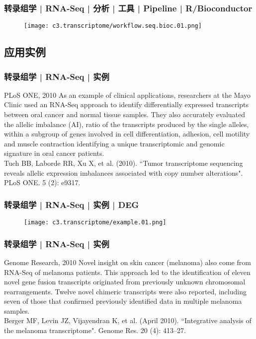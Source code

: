 \begin{frame}
  \frametitle{转录组学 | RNA-Seq | 分析 | 工具 | Pipeline | R/Bioconductor}
  \begin{figure}
    \centering
    \texttt{[image: c3.transcriptome/workflow.seq.bioc.01.png]}
  \end{figure}
\end{frame}

\subsection{应用实例}
\begin{frame}
  \frametitle{转录组学 | RNA-Seq | 实例}
  \begin{block}{PLoS ONE, 2010}
  As an example of clinical applications, researchers at the Mayo Clinic used an RNA-Seq approach to identify differentially expressed transcripts between oral cancer and normal tissue samples. They also accurately evaluated the allelic imbalance (AI), ratio of the transcripts produced by the single alleles, within a subgroup of genes involved in cell differentiation, adhesion, cell motility and muscle contraction identifying a unique transcriptomic and genomic signature in oral cancer patients.\\
  \vspace{0.5em}
 Tuch BB, Laborde RR, Xu X, et al. (2010). ``Tumor transcriptome sequencing reveals allelic expression imbalances associated with copy number alterations". PLoS ONE. 5 (2): e9317. 
  \end{block}
\end{frame}

\begin{frame}
  \frametitle{转录组学 | RNA-Seq | 实例 | DEG}
  \begin{figure}
    \centering
    \texttt{[image: c3.transcriptome/example.01.png]}
  \end{figure}
\end{frame}

\begin{frame}
  \frametitle{转录组学 | RNA-Seq | 实例}
  \begin{block}{Genome Research, 2010}
   Novel insight on skin cancer (melanoma) also come from RNA-Seq of melanoma patients. This approach led to the identification of eleven novel gene fusion transcripts originated from previously unknown chromosomal rearrangements. Twelve novel chimeric transcripts were also reported, including seven of those that confirmed previously identified data in multiple melanoma samples.\\
   \vspace{0.5em}
Berger MF, Levin JZ, Vijayendran K, et al. (April 2010). ``Integrative analysis of the melanoma transcriptome". Genome Res. 20 (4): 413–27. 
  \end{block}
\end{frame}

